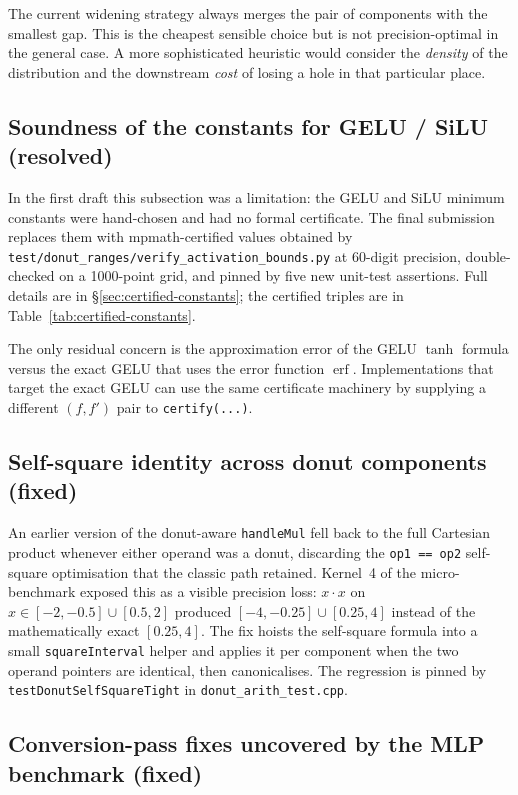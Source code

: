 \documentclass[11pt,a4paper]{article}
\theoremstyle{plain}
\begin{document}
The current widening strategy always merges the pair of components
with the smallest gap. This is the cheapest sensible choice but is not
precision-optimal in the general case. A more sophisticated heuristic
would consider the \emph{density} of the distribution and the
downstream \emph{cost} of losing a hole in that particular place.

\subsection{Soundness of the constants for GELU / SiLU (resolved)}

In the first draft this subsection was a limitation: the GELU and
SiLU minimum constants were hand-chosen and had no formal
certificate. The final submission replaces them with mpmath-certified
values obtained by
\texttt{test/donut\_ranges/verify\_activation\_bounds.py} at 60-digit
precision, double-checked on a 1000-point grid, and pinned by five
new unit-test assertions. Full details are in
\S\ref{sec:certified-constants}; the certified triples are in
Table~\ref{tab:certified-constants}.

The only residual concern is the approximation error of the GELU
$\tanh$ formula versus the exact GELU that uses the error function
$\operatorname{erf}$. Implementations that target the exact GELU can
use the same certificate machinery by supplying a different
$(f, f')$ pair to \texttt{certify(...)}.

\subsection{Self-square identity across donut components (fixed)}
\label{sec:limit-square}

An earlier version of the donut-aware \texttt{handleMul} fell back to
the full Cartesian product whenever either operand was a donut,
discarding the \texttt{op1 == op2} self-square optimisation that the
classic path retained. Kernel~4 of the micro-benchmark exposed this
as a visible precision loss: $x\cdot x$ on
$x\in[-2,-0.5]\cup[0.5,2]$ produced
$[-4,-0.25]\cup[0.25,4]$ instead of the mathematically exact
$[0.25, 4]$. The fix hoists the self-square formula into a small
\texttt{squareInterval} helper and applies it per component when the
two operand pointers are identical, then canonicalises. The
regression is pinned by
\texttt{testDonutSelfSquareTight} in \texttt{donut\_arith\_test.cpp}.

\subsection{Conversion-pass fixes uncovered by the MLP benchmark (fixed)}
\label{sec:limit-convfix}
\end{document}
